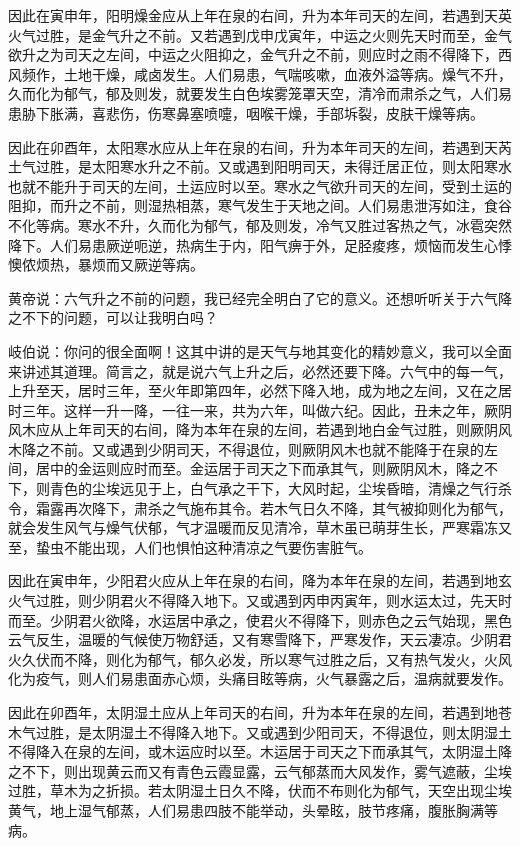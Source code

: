 \documentclass[a4paper,12pt,UTF8,twoside]{ctexbook}
\begin{document}
因此在寅申年，阳明燥金应从上年在泉的右间，升为本年司天的左间，若遇到天英火气过胜，是金气升之不前。又若遇到戊申戊寅年，中运之火则先天时而至，金气欲升之为司天之左间，中运之火阻抑之，金气升之不前，则应时之雨不得降下，西风频作，土地干燥，咸卤发生。人们易患，气喘咳嗽，血液外溢等病。燥气不升，久而化为郁气，郁及则发，就要发生白色埃雾笼罩天空，清冷而肃杀之气，人们易患胁下胀满，喜悲伤，伤寒鼻塞喷嚏，咽喉干燥，手部坼裂，皮肤干燥等病。

因此在卯酉年，太阳寒水应从上年在泉的右间，升为本年司天的左间，若遇到天芮土气过胜，是太阳寒水升之不前。又或遇到阳明司天，未得迁居正位，则太阳寒水也就不能升于司天的左间，土运应时以至。寒水之气欲升司天的左间，受到土运的阻抑，而升之不前，则湿热相蒸，寒气发生于天地之间。人们易患泄泻如注，食谷不化等病。寒水不升，久而化为郁气，郁及则发，冷气又胜过客热之气，冰雹突然降下。人们易患厥逆呃逆，热病生于内，阳气痹于外，足胫痠疼，烦恼而发生心悸懊侬烦热，暴烦而又厥逆等病。

黄帝说：六气升之不前的问题，我已经完全明白了它的意义。还想听听关于六气降之不下的问题，可以让我明白吗？

岐伯说：你问的很全面啊！这其中讲的是天气与地其变化的精妙意义，我可以全面来讲述其道理。简言之，就是说六气上升之后，必然还要下降。六气中的每一气，上升至天，居时三年，至火年即第四年，必然下降入地，成为地之左间，又在之居时三年。这样一升一降，一往一来，共为六年，叫做六纪。因此，丑未之年，厥阴风木应从上年司天的右间，降为本年在泉的左间，若遇到地白金气过胜，则厥阴风木降之不前。又或遇到少阴司天，不得退位，则厥阴风木也就不能降于在泉的左间，居中的金运则应时而至。金运居于司天之下而承其气，则厥阴风木，降之不下，则青色的尘埃远见于上，白气承之干下，大风时起，尘埃昏暗，清燥之气行杀令，霜露再次降下，肃杀之气施布其令。若木气日久不降，其气被抑则化为郁气，就会发生风气与燥气伏郁，气才温暖而反见清冷，草木虽已萌芽生长，严寒霜冻又至，蛰虫不能出现，人们也惧怕这种清凉之气要伤害脏气。

因此在寅申年，少阳君火应从上年在泉的右间，降为本年在泉的左间，若遇到地玄火气过胜，则少阴君火不得降入地下。又或遇到丙申丙寅年，则水运太过，先天时而至。少阴君火欲降，水运居中承之，使君火不得降下，则赤色之云气始现，黑色云气反生，温暖的气候使万物舒适，又有寒雪降下，严寒发作，天云凄凉。少阴君火久伏而不降，则化为郁气，郁久必发，所以寒气过胜之后，又有热气发火，火风化为疫气，则人们易患面赤心烦，头痛目眩等病，火气暴露之后，温病就要发作。

因此在卯酉年，太阴湿土应从上年司天的右间，升为本年在泉的左间，若遇到地苍木气过胜，是太阴湿土不得降入地下。又或遇到少阳司天，不得退位，则太阴湿土不得降入在泉的左间，或木运应时以至。木运居于司天之下而承其气，太阴湿土降之不下，则出现黄云而又有青色云霞显露，云气郁蒸而大风发作，雾气遮蔽，尘埃过胜，草木为之折损。若太阴湿土日久不降，伏而不布则化为郁气，天空出现尘埃黄气，地上湿气郁蒸，人们易患四肢不能举动，头晕眩，肢节疼痛，腹胀胸满等病。
\end{document}
